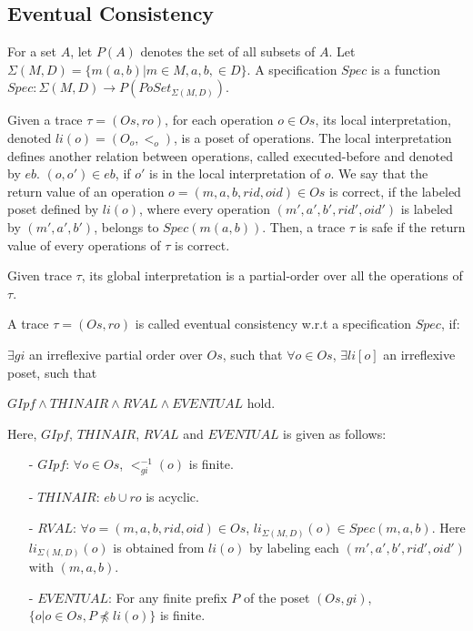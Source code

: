 {\subsection{Eventual Consistency}
\label{subsec:eventual consistency}

For a set $A$, let $P(A)$ denotes the set of all subsets of $A$. Let $\Sigma(M,D) = \{ m(a,b) \vert m \in M, a,b, \in D \}$. A specification $Spec$ is a function $Spec: \Sigma(M,D) \rightarrow P(PoSet_{\Sigma(M,D)})$.

Given a trace $\tau = (Os,ro)$, for each operation $o \in Os$, its local interpretation, denoted $li(o) = (O_o,<_o)$, is a poset of operations. The local interpretation defines another relation between operations, called executed-before and denoted by $eb$. $(o,o') \in eb$, if $o'$ is in the local interpretation of $o$. We say that the return value of an operation $o = (m,a,b,rid,oid) \in Os$ is correct, if the labeled poset defined by $li(o)$, where every operation $(m',a',b',rid',oid')$ is labeled by $(m',a',b')$, belongs to $Spec(m(a,b))$. Then, a trace $\tau$ is safe if the return value of every operations of $\tau$ is correct.

Given trace $\tau$, its global interpretation is a partial-order over all the operations of $\tau$.

\begin{definition}
\label{definition:eventual consistency}
A trace $\tau = (Os,ro)$ is called eventual consistency w.r.t a specification $Spec$, if:

$\exists gi$ an irreflexive partial order over $Os$, such that $\forall o \in Os$, $\exists li[o]$ an irreflexive poset, such that

$\mathit{GIpf} \wedge \mathit{THINAIR} \wedge \mathit{RVAL} \wedge \mathit{EVENTUAL}$ hold.
\end{definition}

Here, $GIpf$, $THINAIR$, $RVAL$ and $EVENTUAL$ is given as follows:

\begin{itemize}
\setlength{\itemsep}{0.5pt}
\item[-] $\mathit{GIpf}$: $\forall o \in Os$, $<^{-1}_{gi}(o)$ is finite.

\item[-] $\mathit{THINAIR}$: $eb \cup ro$ is acyclic.

\item[-] $\mathit{RVAL}$: $\forall o = (m,a,b,rid,oid) \in Os$, $li_{\Sigma(M,D)}(o) \in Spec(m,a,b)$. Here $li_{\Sigma(M,D)}(o)$ is obtained from $li(o)$ by labeling each $(m',a',b',rid',oid')$ with $(m,a,b)$.

\item[-] $\mathit{EVENTUAL}$: For any finite prefix $P$ of the poset $(Os,gi)$, $\{ o \vert o \in Os, P \npreceq li(o) \}$ is finite.
\end{itemize}
}
